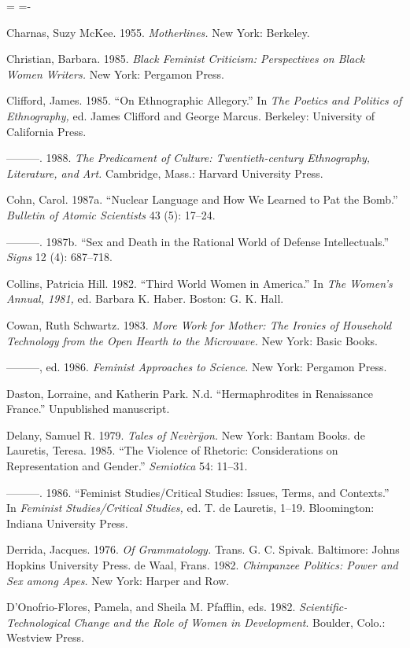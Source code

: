 \documentclass[DIV=12,%
               BCOR=10mm,%
               headinclude=false,%
               footinclude=false,open=any,%
               fontsize=11pt,%
               twoside,%
               paper=210mm:11in]%
               {scrbook}
\newenvironment*{amusebiblio}{
  \leftskip=\parindent
  \parindent=-\parindent
  \smallskip
  \indent
}{\smallskip}
\newcommand*{\Slash}{\slash\hspace{0pt}}
\begin{document}
\begin{amusebiblio}
Charnas, Suzy McKee. 1955. \emph{Motherlines.} New York: Berkeley.


Christian, Barbara. 1985. \emph{Black Feminist Criticism: Perspectives on Black Women Writers.} New York: Pergamon Press.


Clifford, James. 1985. “On Ethnographic Allegory.” In \emph{The Poetics and Politics of Ethnography,} ed. James Clifford and George Marcus. Berkeley: University of California Press.


———. 1988. \emph{The Predicament of Culture: Twentieth-century Ethnography, Literature, and Art.} Cambridge, Mass.: Harvard University Press.


Cohn, Carol. 1987a. “Nuclear Language and How We Learned to Pat the Bomb.” \emph{Bulletin of Atomic Scientists} 43 (5): 17–24.


———. 1987b. “Sex and Death in the Rational World of Defense Intellectuals.” \emph{Signs} 12 (4): 687–718.


Collins, Patricia Hill. 1982. “Third World Women in America.” In \emph{The Women’s Annual, 1981,} ed. Barbara K. Haber. Boston: G. K. Hall.


Cowan, Ruth Schwartz. 1983. \emph{More Work for Mother: The Ironies of Household Technology from the Open Hearth to the Microwave.} New York: Basic Books.


———, ed. 1986. \emph{Feminist Approaches to Science.} New York: Pergamon Press.


Daston, Lorraine, and Katherin Park. N.d. “Hermaphrodites in Renaissance France.” Unpublished manuscript.


Delany, Samuel R. 1979. \emph{Tales of Nevèrÿon.} New York: Bantam Books. de Lauretis, Teresa. 1985. “The Violence of Rhetoric: Considerations on Representation and Gender.” \emph{Semiotica} 54: 11–31.


———. 1986. “Feminist Studies\Slash{}Critical Studies: Issues, Terms, and Contexts.” In \emph{Feminist Studies\Slash{}Critical Studies,} ed. T. de Lauretis, 1–19. Bloomington: Indiana University Press.


Derrida, Jacques. 1976. \emph{Of Grammatology.} Trans. G. C. Spivak. Baltimore: Johns Hopkins University Press. de Waal, Frans. 1982. \emph{Chimpanzee Politics: Power and Sex among Apes.} New York: Harper and Row.


D’Onofrio-Flores, Pamela, and Sheila M. Pfafflin, eds. 1982. \emph{Scientific-Technological Change and the Role of Women in Development}. Boulder, Colo.: Westview Press.



\end{amusebiblio}
\end{document}
